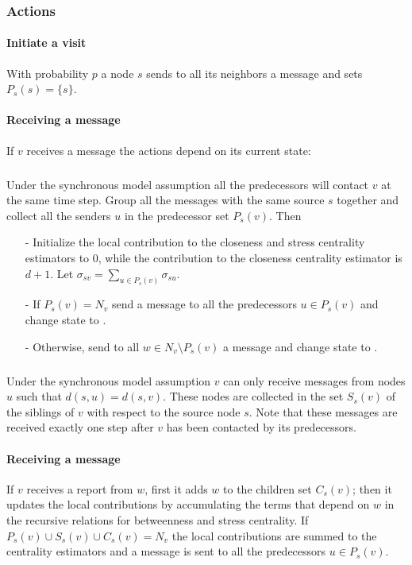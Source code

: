 \subsubsection{Actions}

\paragraph{Initiate a visit} With probability $p$ a node $s$ sends to all its neighbors a  message and sets $P_s(s) = \{s\}$.

\paragraph{Receiving a  message} If $v$ receives a  message the actions depend on its current state:

\subparagraph{} Under the synchronous model assumption all the predecessors will contact 
$v$ at the same time step. Group all the messages with the same source $s$ together and collect all the senders $u$ in the predecessor set $P_s(v)$. Then
\begin{itemize}
\item[-] Initialize the local contribution to the closeness and stress centrality estimators to $0$, while the contribution to the closeness centrality estimator is $d+1$. Let $\sigma_{sv} = \sum_{u \in P_s(v)} \sigma_{su}$.
\item[-] If $P_s(v) = N_v$ send a  message to all the predecessors $u \in P_s(v)$ and change state to . 
\item[-] Otherwise, send to all $w \in N_v \setminus P_s(v)$ a  message and change state to .
\end{itemize}

\subparagraph{} Under the synchronous model assumption $v$ can only receive  messages from nodes $u$ such that $d(s,u) = d(s,v)$. These nodes are collected in the set $S_s(v)$ of the siblings of $v$ with respect to the source node $s$. Note that these messages are received exactly one step after $v$ has been contacted by its predecessors.

\paragraph{Receiving a \mrep{} message} If $v$ receives a report from $w$, first it adds $w$ to the children set $C_s(v)$; then it updates the local contributions by accumulating the terms that depend on $w$ in the recursive relations for betweenness and stress centrality. If $P_s(v) \cup S_s(v) \cup C_s(v) = N_v$ the local contributions are summed to the centrality estimators and a  message is sent to all the predecessors $u \in P_s(v)$.